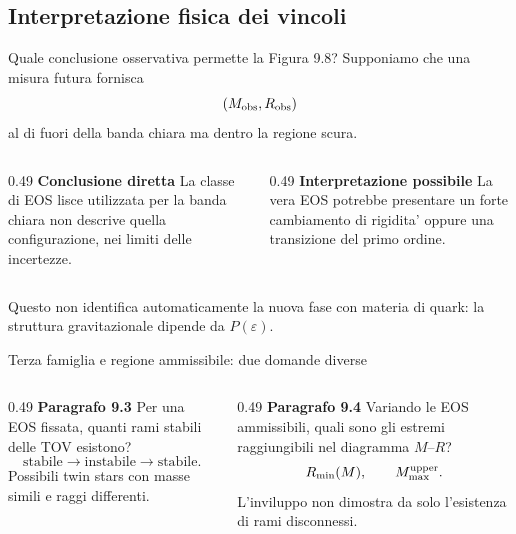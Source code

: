 \subsection{Interpretazione fisica dei vincoli}
\begin{frame}{Quale conclusione osservativa permette la Figura 9.8?}
\small
Supponiamo che una misura futura fornisca
\[
(M_{\rm obs},R_{\rm obs})
\]
al di fuori della banda chiara ma dentro la regione scura.
\medskip
\begin{columns}[T,onlytextwidth]
\begin{column}{0.49\textwidth}
\textbf{Conclusione diretta}
\medskip
La classe di EOS lisce utilizzata per la banda chiara non descrive quella configurazione, nei limiti delle incertezze.
\end{column}
\begin{column}{0.49\textwidth}
\textbf{Interpretazione possibile}
\medskip
La vera EOS potrebbe presentare un forte cambiamento di rigidita' oppure una transizione del primo ordine.
\end{column}
\end{columns}
\medskip
Questo non identifica automaticamente la nuova fase con materia di quark: la struttura gravitazionale dipende da $P(\varepsilon)$.
\end{frame}

\begin{frame}{Terza famiglia e regione ammissibile: due domande diverse}
\small
\begin{columns}[T,onlytextwidth]
\begin{column}{0.49\textwidth}
\textbf{Paragrafo 9.3}
\medskip
Per una EOS fissata, quanti rami stabili delle TOV esistono?
\[
\text{stabile}\to\text{instabile}
\to\text{stabile}.
\]
Possibili twin stars con masse simili e raggi differenti.
\end{column}
\begin{column}{0.49\textwidth}
\textbf{Paragrafo 9.4}
\medskip
Variando le EOS ammissibili, quali sono gli estremi raggiungibili nel diagramma $M$--$R$?
\[
R_{\min}(M),\qquad M_{\max}^{\rm upper}.
\]
L'inviluppo non dimostra da solo l'esistenza di rami disconnessi.
\end{column}
\end{columns}
\end{frame}


